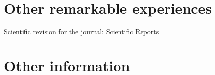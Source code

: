 \documentclass[letterpaper]{twentysecondcv} %
\begin{document}
\newpage
\makeprofile
\section{Other remarkable experiences}


Scientific revision for the journal: \href{http://www.nature.com/srep/}{\underline{Scientific Reports}}



%


\section{Other information}
\end{document}
